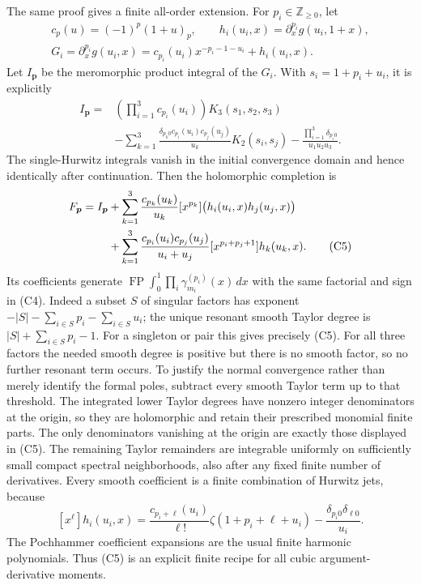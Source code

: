 The same proof gives a finite all-order extension. For
$p_i\in\mathbb Z_{\ge0}$, let
\begin{gather*}
 c_p(u)=(-1)^p(1+u)_p,\qquad
 h_i(u_i,x)=\partial_x^{p_i}g(u_i,1+x),\\
 G_i=\partial_x^{p_i}g(u_i,x)
     =c_{p_i}(u_i)x^{-p_i-1-u_i}+h_i(u_i,x).
\end{gather*}
Let $I_{\boldsymbol p}$ be the meromorphic product integral of the
$G_i$. With $s_i=1+p_i+u_i$, it is explicitly
\begin{align*}
 I_{\boldsymbol p}={}&\left(\prod_{i=1}^3 c_{p_i}(u_i)\right)
                         K_3(s_1,s_2,s_3)\\
 &-\sum_{k=1}^3\frac{\delta_{p_k0}c_{p_i}(u_i)c_{p_j}(u_j)}{u_k}
                         K_2(s_i,s_j)
 -\frac{\prod_{i=1}^3\delta_{p_i0}}{u_1u_2u_3}.
\end{align*}
The single-Hurwitz integrals vanish in the initial convergence domain
and hence identically after continuation.
Then the holomorphic completion is
\begin{align}
 F_{\boldsymbol p}=I_{\boldsymbol p}
 &+\sum_{k=1}^3\frac{c_{p_k}(u_k)}{u_k}
       [x^{p_k}]\bigl(h_i(u_i,x)h_j(u_j,x)\bigr)\notag\\
 &+\sum_{k=1}^3\frac{c_{p_i}(u_i)c_{p_j}(u_j)}{u_i+u_j}
       [x^{p_i+p_j+1}]h_k(u_k,x).             \tag{C5}\label{cub:C5}
\end{align}
Its coefficients generate
$\operatorname{FP}\int_0^1\prod_i\gamma_{m_i}^{(p_i)}(x)\,dx$ with
the same factorial and sign in (C4). Indeed a subset $S$ of singular
factors has exponent $-|S|-\sum_{i\in S}p_i-\sum_{i\in S}u_i$;
the unique resonant smooth Taylor degree is
$|S|+\sum_{i\in S}p_i-1$.  For a singleton or pair this gives precisely
(C5). For all three factors the needed smooth degree is positive but
there is no smooth factor, so no further resonant term occurs.
To justify the normal convergence rather than merely identify the
formal poles, subtract every smooth Taylor term up to that threshold.
The integrated lower Taylor degrees have nonzero integer denominators
at the origin, so they are holomorphic and retain their prescribed
monomial finite parts. The only denominators vanishing at the origin
are exactly those displayed in (C5). The remaining Taylor remainders
are integrable uniformly on sufficiently small compact spectral
neighborhoods, also after any fixed finite number of derivatives.
Every smooth coefficient is a finite combination of Hurwitz jets,
because
\[
 [x^\ell]h_i(u_i,x)
 =\frac{c_{p_i+\ell}(u_i)}{\ell!}
      \zeta(1+p_i+\ell+u_i)
   -\frac{\delta_{p_i0}\delta_{\ell0}}{u_i}.
\]
The Pochhammer coefficient expansions are the usual finite harmonic
polynomials. Thus (C5) is an explicit finite recipe for all cubic
argument-derivative moments.

